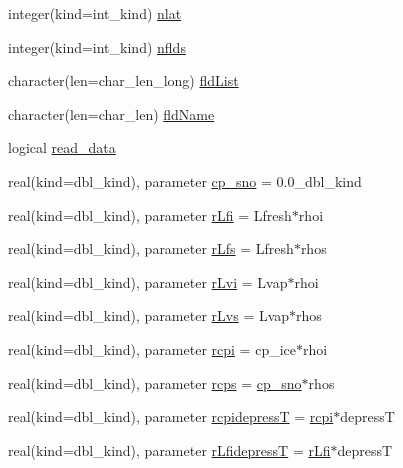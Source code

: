 \begin{DoxyCompactItemize}
integer(kind=int\_\-kind) \hyperlink{namespaceice__prescribed__mod_a553da06a37ff08c4047eaf0e66d4ec53}{nlat}
\item 
integer(kind=int\_\-kind) \hyperlink{namespaceice__prescribed__mod_aeeaddf3904b52191dfe9e843ae36bcd0}{nflds}
\item 
character(len=char\_\-len\_\-long) \hyperlink{namespaceice__prescribed__mod_a5bdbd6cc049323f35a5c8f6e4613c369}{fldList}
\item 
character(len=char\_\-len) \hyperlink{namespaceice__prescribed__mod_a47d61c09a57e43eefae7895db766851a}{fldName}
\item 
logical \hyperlink{namespaceice__prescribed__mod_a07b5b645c36b9f4e6ffecb44561d737e}{read\_\-data}
\item 
real(kind=dbl\_\-kind), parameter \hyperlink{namespaceice__prescribed__mod_a9a106a2104e57fea97c1ddf91ffb9c0c}{cp\_\-sno} = 0.0\_\-dbl\_\-kind
\item 
real(kind=dbl\_\-kind), parameter \hyperlink{namespaceice__prescribed__mod_a39606ec992e07a82b93638f009662c22}{rLfi} = Lfresh$\ast$rhoi
\item 
real(kind=dbl\_\-kind), parameter \hyperlink{namespaceice__prescribed__mod_a6d6aa0ced82499b6a9e9fef93efc4215}{rLfs} = Lfresh$\ast$rhos
\item 
real(kind=dbl\_\-kind), parameter \hyperlink{namespaceice__prescribed__mod_a142d1bc283475ba8d20f1f9693a7f0a7}{rLvi} = Lvap$\ast$rhoi
\item 
real(kind=dbl\_\-kind), parameter \hyperlink{namespaceice__prescribed__mod_a4dfc1b519ac719ccd1df0821e2ee9d05}{rLvs} = Lvap$\ast$rhos
\item 
real(kind=dbl\_\-kind), parameter \hyperlink{namespaceice__prescribed__mod_ad7fb751647d1c0fce8353923c934dcd1}{rcpi} = cp\_\-ice$\ast$rhoi
\item 
real(kind=dbl\_\-kind), parameter \hyperlink{namespaceice__prescribed__mod_a4d489995be632463ce884c66d364ae9b}{rcps} = \hyperlink{namespaceice__prescribed__mod_a9a106a2104e57fea97c1ddf91ffb9c0c}{cp\_\-sno}$\ast$rhos
\item 
real(kind=dbl\_\-kind), parameter \hyperlink{namespaceice__prescribed__mod_a1c5ca290fc59d5ca3c0587261be63bfa}{rcpidepressT} = \hyperlink{namespaceice__prescribed__mod_ad7fb751647d1c0fce8353923c934dcd1}{rcpi}$\ast$depressT
\item 
real(kind=dbl\_\-kind), parameter \hyperlink{namespaceice__prescribed__mod_a5331e73657db370f6bc527f0e680a647}{rLfidepressT} = \hyperlink{namespaceice__prescribed__mod_a39606ec992e07a82b93638f009662c22}{rLfi}$\ast$depressT
\end{DoxyCompactItemize}


